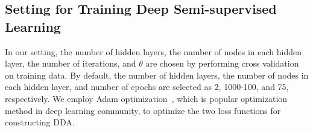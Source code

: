 
\subsection{Setting for Training Deep Semi-supervised Learning}
\label{sec:setting}
In our setting, the number of hidden layers, the number of nodes in each hidden layer, the number of iterations, and $\theta$ are chosen by performing cross validation on training data. By default, the number of hidden layers, the number of nodes in each hidden layer, and number of epochs are selected as 2, 1000-100, and 75, respectively. We employ Adam optimization~\cite{kingma2014adam}, which is popular optimization method in deep learning community, to optimize the two loss functions for constructing DDA. %


%

